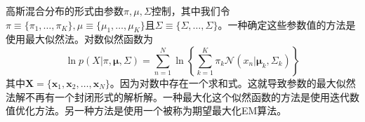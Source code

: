 高斯混合分布的形式由参数$\pi,\mu,\Sigma$控制，其中我们令$\pi\equiv \{\pi_1,\dots,\pi_K\},\mu\equiv \{\mu_1,\dots,\mu_K\}$且$\Sigma\equiv\{\Sigma,\dots,\Sigma\}$。一种确定这些参数值的方法是使用最大似然法。对数似然函数为
\begin{equation}
	\ln p(X|\pi,\boldsymbol{\mu},\Sigma)=\sum_{n=1}^{N}\ln \left\{\sum_{k=1}^{K}\pi_k\mathcal{N}(x_n|\boldsymbol{\mu}_k,\Sigma_k) \right\}
\end{equation}
其中$\boldsymbol{X}=\{\boldsymbol{x}_1,\boldsymbol{x}_2,\dots,\boldsymbol{x}_N\}$。因为对数中存在一个求和式。这就导致参数的最大似然法解不再有一个封闭形式的解析解。一种最大化这个似然函数的方法是使用迭代数值优化方法。另一种方法是使用一个被称为期望最大化EM算法。